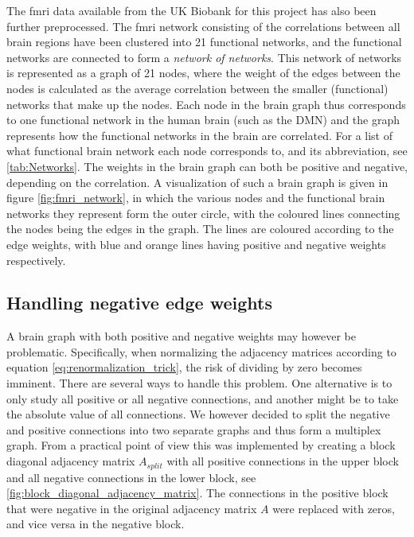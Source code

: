 The \acrshort{fmri} data available from the UK Biobank for this project has also been further preprocessed. The \acrshort{fmri} network consisting of the correlations between all brain regions have been clustered into 21 functional networks, and the functional networks are connected to form a \textit{network of networks}. This network of networks is represented as a graph of 21 nodes, where the weight of the edges between the nodes is calculated as the average correlation between the smaller (functional) networks that make up the nodes. Each node in the brain graph thus corresponds to one functional network in the human brain (such as the DMN) and the graph represents how the functional networks in the brain are correlated. For a list of what functional brain network each node corresponds to, and its abbreviation, see \cref{tab:Networks}. The weights in the brain graph can both be positive and negative, depending on the correlation. A visualization of such a brain graph is given in figure \ref{fig:fmri_network}, in which the various nodes and the functional brain networks they represent form the outer circle, with the coloured lines connecting the nodes being the edges in the graph. The lines are coloured according to the edge weights, with blue and orange lines having positive and negative weights respectively.



\subsection{Handling negative edge weights}

A brain graph with both positive and negative weights may however be problematic. Specifically, when normalizing the adjacency matrices according to equation \eqref{eq:renormalization_trick}, the risk of dividing by zero becomes imminent. There are several ways to handle this problem. One alternative is to only study all positive or all negative connections, and another might be to take the absolute value of all connections. We however decided to split the negative and positive connections into two separate graphs and thus form a multiplex graph. From a practical point of view this was implemented by creating a block diagonal adjacency matrix $A_{split}$ with all positive connections in the upper block and all negative connections in the lower block, see \cref{fig:block_diagonal_adjacency_matrix}. The connections in the positive block that were negative in the original adjacency matrix $A$ were replaced with zeros, and vice versa in the negative block.

